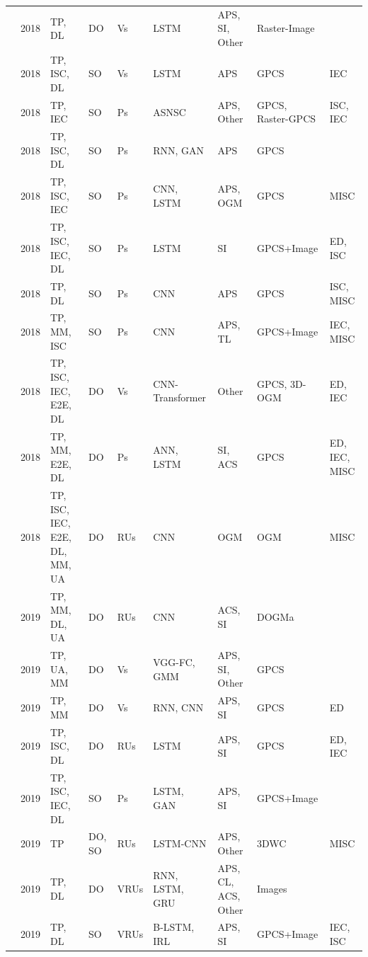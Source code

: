 \begin{table}[h!]
{\begin{tabular}{lllllllll}
			\cite{park2018sequence} & 2018 & TP, DL & DO & Vs & LSTM & APS, SI, Other & Raster-Image &  \\
			\cite{deo2018convolutional} & 2018 & TP, ISC, DL & SO & Vs & LSTM & APS & GPCS & IEC \\
			\cite{habibi2018context} & 2018 & TP, IEC & SO & Ps & ASNSC & APS, Other & GPCS, Raster-GPCS & ISC, IEC \\
			\cite{gupta2018social} & 2018 & TP, ISC, DL & SO & Ps & RNN, GAN & APS & GPCS &  \\
			\cite{pfeiffer2018data} & 2018 & TP, ISC, IEC & SO & Ps & CNN, LSTM & APS, OGM & GPCS & MISC \\
			\cite{manh2018scene} & 2018 & TP, ISC, IEC, DL & SO & Ps & LSTM & SI & GPCS+Image & ED, ISC \\
			\cite{nikhil2018convolutional} & 2018 & TP, DL & SO & Ps & CNN & APS & GPCS & ISC, MISC \\
			\cite{radwan2018multimodal} & 2018 & TP, MM, ISC & SO & Ps & CNN & APS, TL & GPCS+Image & IEC, MISC \\
			\cite{luo2018fast} & 2018 & TP, ISC, IEC, E2E, DL & DO & Vs & CNN-Transformer & Other & GPCS, 3D-OGM & ED, IEC \\
			\cite{rehder2018pedestrian} & 2018 & TP, MM, E2E, DL & DO & Ps & ANN, LSTM & SI, ACS & GPCS & ED, IEC, MISC \\
			\cite{hoermann2018dynamic} & 2018 & TP, ISC, IEC, E2E, DL, MM, UA & DO & RUs & CNN & OGM & OGM & MISC \\
			\cite{cui2019multimodal} & 2019 & TP, MM, DL, UA & DO & RUs & CNN & ACS, SI & DOGMa &  \\
			\cite{huang2019uncertainty} & 2019 & TP, UA, MM & DO & Vs & VGG-FC, GMM & APS, SI, Other & GPCS &  \\
			\cite{tang2019multiple} & 2019 & TP, MM & DO & Vs & RNN, CNN & APS, SI & GPCS & ED \\
			\cite{ma2019trafficpredict} & 2019 & TP, ISC, DL & DO & RUs & LSTM & APS, SI & GPCS & ED, IEC \\
			\cite{sadeghian2019sophie} & 2019 & TP, ISC, IEC, DL & SO & Ps & LSTM, GAN & APS, SI & GPCS+Image &  \\
			\cite{chandra2019traphic} & 2019 & TP & DO, SO & RUs & LSTM-CNN & APS, Other & 3DWC & MISC \\
			\cite{xiong2019recurrent} & 2019 & TP, DL & DO & VRUs & RNN, LSTM, GRU & APS, CL, ACS, Other & Images &  \\
			\cite{saleh2019contextual} & 2019 & TP, DL & SO & VRUs & B-LSTM, IRL & APS, SI & GPCS+Image & IEC, ISC \\

\end{tabular}}
\end{table}
